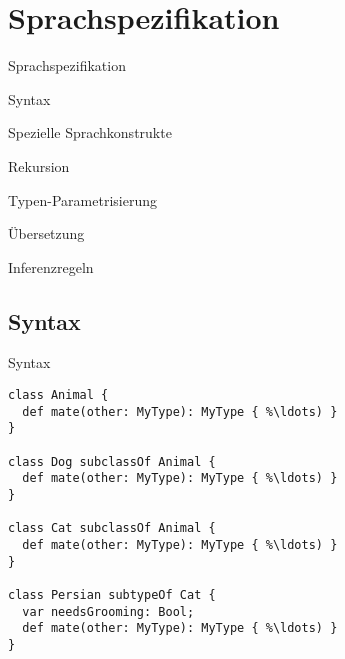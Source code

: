 \section{Sprachspezifikation}
\begin{frame}[t]{Sprachspezifikation}

	\begin{bigitemize}{3mm}
		\item Syntax
		\item Spezielle Sprachkonstrukte
		\item Rekursion
		\item Typen-Parametrisierung
		\item Übersetzung
		\item Inferenzregeln
	\end{bigitemize}
\end{frame}

\subsection{Syntax}
\begin{frame}[fragile]{Syntax}
\begin{lstlisting}[language=ooplss]
class Animal {
  def mate(other: MyType): MyType { %\ldots) }
}

class Dog subclassOf Animal {
  def mate(other: MyType): MyType { %\ldots) }
}

class Cat subclassOf Animal {
  def mate(other: MyType): MyType { %\ldots) }
}

class Persian subtypeOf Cat {
  var needsGrooming: Bool;
  def mate(other: MyType): MyType { %\ldots) }
}
\end{lstlisting}
\end{frame}

